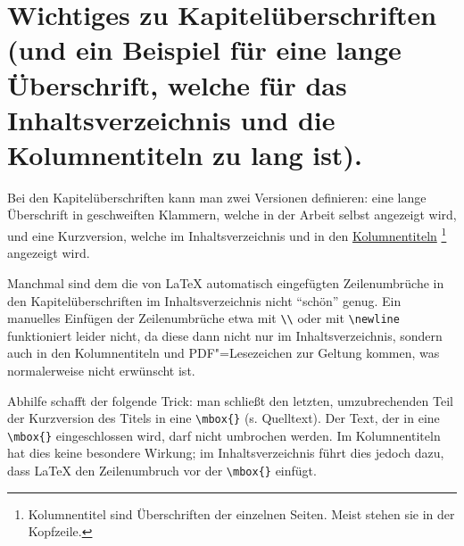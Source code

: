 \section[Wichtiges zu Kapitelüberschriften \mbox{(Kurzversion für das Inhaltsverzeichnis etc.)}]{Wichtiges zu Kapitelüberschriften (und ein Beispiel für eine lange Überschrift, welche für das Inhaltsverzeichnis und die Kolumnentiteln zu lang ist).}%
\label{chap:Titles}
%
%
Bei den Kapitelüberschriften kann man zwei Versionen definieren:
eine lange Überschrift in geschweiften Klammern, welche in der Arbeit selbst angezeigt wird, 
und eine Kurzversion, welche im Inhaltsverzeichnis und in den 
\href{https://de.wikipedia.org/wiki/Kolumnentitel}{Kolumnentiteln}%
\footnote{Kolumnentitel sind Überschriften der einzelnen Seiten. Meist stehen sie in der Kopfzeile.}
angezeigt wird.

Manchmal sind dem  die von \LaTeX{} automatisch eingefügten Zeilenumbrüche in den Kapitelüberschriften im Inhaltsverzeichnis nicht \enquote{schön} genug.
Ein manuelles Einfügen der Zeilenumbrüche etwa mit \verb+\\+ oder mit \verb+\newline+ funktioniert leider nicht,
da diese dann nicht nur im Inhaltsverzeichnis, sondern auch in den Kolumnentiteln und PDF"=Lesezeichen zur Geltung kommen, 
was normalerweise nicht erwünscht ist.

Abhilfe schafft der folgende Trick:
man schließt den letzten, umzubrechenden Teil der Kurzversion des Titels in eine \verb+\mbox{}+ (s. Quelltext).
Der Text, der in eine \verb+\mbox{}+ eingeschlossen wird, darf nicht umbrochen werden.
Im Kolumnentiteln hat dies keine besondere Wirkung; im Inhaltsverzeichnis führt dies jedoch dazu, dass \LaTeX{} den Zeilenumbruch vor der \verb+\mbox{}+ einfügt.